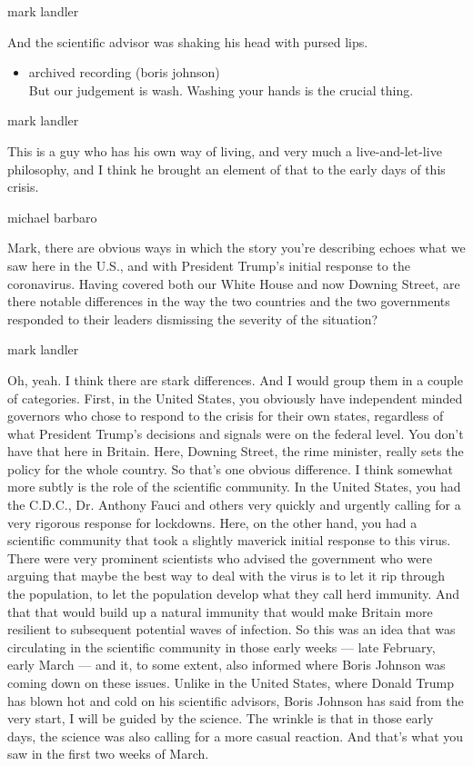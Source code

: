 mark landler

And the scientific advisor was shaking his head with pursed lips.

\begin{itemize}
\tightlist
\item
  archived recording (boris johnson)\\
  But our judgement is wash. Washing your hands is the crucial thing.
\end{itemize}

mark landler

This is a guy who has his own way of living, and very much a
live-and-let-live philosophy, and I think he brought an element of that
to the early days of this crisis.

michael barbaro

Mark, there are obvious ways in which the story you're describing echoes
what we saw here in the U.S., and with President Trump's initial
response to the coronavirus. Having covered both our White House and now
Downing Street, are there notable differences in the way the two
countries and the two governments responded to their leaders dismissing
the severity of the situation?

mark landler

Oh, yeah. I think there are stark differences. And I would group them in
a couple of categories. First, in the United States, you obviously have
independent minded governors who chose to respond to the crisis for
their own states, regardless of what President Trump's decisions and
signals were on the federal level. You don't have that here in Britain.
Here, Downing Street, the rime minister, really sets the policy for the
whole country. So that's one obvious difference. I think somewhat more
subtly is the role of the scientific community. In the United States,
you had the C.D.C., Dr. Anthony Fauci and others very quickly and
urgently calling for a very rigorous response for lockdowns. Here, on
the other hand, you had a scientific community that took a slightly
maverick initial response to this virus. There were very prominent
scientists who advised the government who were arguing that maybe the
best way to deal with the virus is to let it rip through the population,
to let the population develop what they call herd immunity. And that
that would build up a natural immunity that would make Britain more
resilient to subsequent potential waves of infection. So this was an
idea that was circulating in the scientific community in those early
weeks --- late February, early March --- and it, to some extent, also
informed where Boris Johnson was coming down on these issues. Unlike in
the United States, where Donald Trump has blown hot and cold on his
scientific advisors, Boris Johnson has said from the very start, I will
be guided by the science. The wrinkle is that in those early days, the
science was also calling for a more casual reaction. And that's what you
saw in the first two weeks of March.

